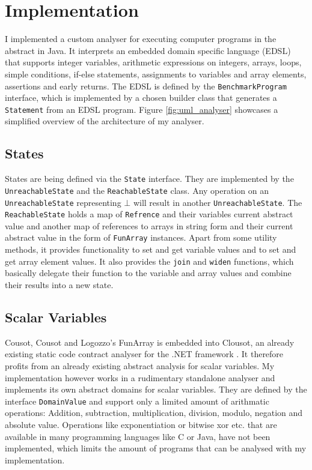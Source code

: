 \chapter{Implementation}

I implemented a custom analyser for executing computer programs in the abstract in Java. It interprets an embedded domain specific language (EDSL) that supports integer variables, arithmetic expressions on integers, arrays, loops, simple conditions, if-else statements, assignments to variables and array elements, assertions and early returns. The EDSL is defined by the \texttt{BenchmarkProgram} interface, which is implemented by a chosen builder class that generates a \texttt{Statement} from an EDSL program. Figure \ref{fig:uml_analyser} showcases a simplified overview of the architecture of my analyser.








\section{States}

States are being defined via the \texttt{State} interface. They are implemented by the \texttt{UnreachableState} and the \texttt{ReachableState} class. Any operation on an \texttt{UnreachableState} representing $\bot$ will result in another \texttt{Unreachable\allowbreak State}. The \texttt{ReachableState} holds a map of \texttt{Refrence} and their variables current abstract value and another map of references to arrays in string form and their current abstract value in the form of \texttt{FunArray} instances. Apart from some utility methods, it provides functionality to set and get variable values and to set and get array element values. It also provides the \texttt{join} and \texttt{widen} functions, which basically delegate their function to the variable and array values and combine their results into a new state. 








\section{Scalar Variables}\label{sec:scalarvariables}
Cousot, Cousot and Logozzo's FunArray is embedded into Clousot, an already existing static code contract analyser for the .NET framework \cite{cousot2011}. It therefore profits from an already existing abstract analysis for scalar variables. My implementation however works in a rudimentary standalone analyser and implements its own abstract domains for scalar variables.
They are defined by the interface \texttt{DomainValue} and support only a limited amount of arithmatic operations: Addition, subtraction, multiplication, division, modulo, negation and absolute value. Operations like exponentiation or bitwise xor etc. that are available in many programming languages like C or Java, have not been implemented, which limits the amount of programs that can be analysed with my implementation. 

